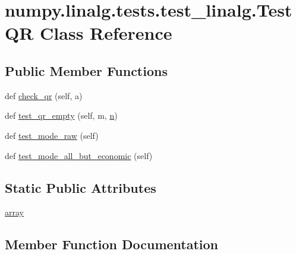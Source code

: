 \hypertarget{classnumpy_1_1linalg_1_1tests_1_1test__linalg_1_1TestQR}{}\section{numpy.\+linalg.\+tests.\+test\+\_\+linalg.\+Test\+QR Class Reference}
\label{classnumpy_1_1linalg_1_1tests_1_1test__linalg_1_1TestQR}
\subsection*{Public Member Functions}
\begin{DoxyCompactItemize}
\item 
def \hyperlink{classnumpy_1_1linalg_1_1tests_1_1test__linalg_1_1TestQR_a564488280b4b28d3b9e80f0ccbf460b0}{check\+\_\+qr} (self, a)
\item 
def \hyperlink{classnumpy_1_1linalg_1_1tests_1_1test__linalg_1_1TestQR_a489d31e0e0640968f62dd77471076513}{test\+\_\+qr\+\_\+empty} (self, m, \hyperlink{namespacenumpy_a352663c52853d2754274407d5cae2832}{n})
\item 
def \hyperlink{classnumpy_1_1linalg_1_1tests_1_1test__linalg_1_1TestQR_a37ce10c9c355072fd158c1bb1a229316}{test\+\_\+mode\+\_\+raw} (self)
\item 
def \hyperlink{classnumpy_1_1linalg_1_1tests_1_1test__linalg_1_1TestQR_aeda36d0e2cae3fc4a0a43b0d87cd1661}{test\+\_\+mode\+\_\+all\+\_\+but\+\_\+economic} (self)
\end{DoxyCompactItemize}
\subsection*{Static Public Attributes}
\begin{DoxyCompactItemize}
\item 
\hyperlink{classnumpy_1_1linalg_1_1tests_1_1test__linalg_1_1TestQR_abe13dfa42b60b5a8640aac46aa22efca}{array}
\end{DoxyCompactItemize}


\subsection{Member Function Documentation}
\mbox{\label{classnumpy_1_1linalg_1_1tests_1_1test__linalg_1_1TestQR_a564488280b4b28d3b9e80f0ccbf460b0}} 
